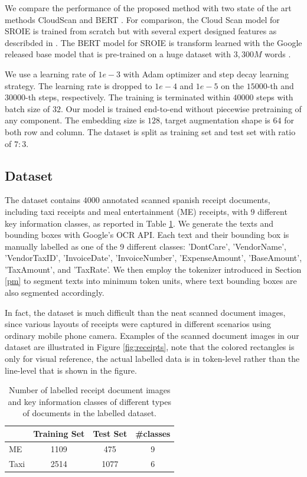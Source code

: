 \documentclass[10pt,twocolumn,letterpaper]{article}
\begin{document}
We compare the performance of the proposed method with two state of the art methods CloudScan \cite{cloudscan} and BERT \cite{bert}. For comparison, the Cloud Scan model for SROIE is trained from scratch but with several expert designed features as describded in \cite{cloudscan}. The BERT model for SROIE is transform learned with the Google released base model that is pre-trained on a huge dataset with $3,300M$ words \cite{bert,bertgit}.

We use a learning rate of $1e-3$ with Adam optimizer and step decay learning strategy. The learning rate is dropped to $1e-4$ and $1e-5$ on the $15000$-th and $30000$-th steps, respectively. The training is terminated within $40000$ steps with batch size of $32$. Our model is trained end-to-end without piecewise pretraining of any component. The embedding size is $128$, target augmentation shape is $64$ for both row and column. The dataset is split as training set and test set with ratio of $7:3$.

\subsection{Dataset}
The dataset contains $4000$ annotated scanned spanish receipt documents, including taxi receipts and meal entertainment (ME) receipts, with $9$ different key information classes, as reported in Table \ref{tab:dataset}. We generate the texts and bounding boxes with Google's OCR API. Each text and their bounding box is manually labelled as one of the 9 different classes: 'DontCare', 'VendorName', 'VendorTaxID', 'InvoiceDate', 'InvoiceNumber', 'ExpenseAmount', 'BaseAmount', 'TaxAmount', and 'TaxRate'. We then employ the tokenizer introduced in Section \ref{pm} to segment texts into minimum token units, where text bounding boxes are also segmented accordingly. 

In fact, the dataset is much difficult than the neat scanned document images, since various layouts of receipts were captured in different scenarios using ordinary mobile phone camera. Examples of the scanned document images in our dataset are illustrated in Figure \ref{fig:receipts}, note that the colored rectangles is only for visual reference, the actual labelled data is in token-level rather than the line-level that is shown in the figure.
\begin{table}
	\caption{Number of labelled receipt document images and key information classes of different types of documents in the labelled dataset.}
\begin{center}
\begin{tabular}{l | c | c | c}
	 & Training Set & Test Set & \#classes \\
	\hline
	ME & 1109 & 475 & 9 \\
	Taxi & 2514 & 1077 & 6 \\
\end{tabular}
\end{center}
	\label{tab:dataset}
\end{table}
\end{document}
